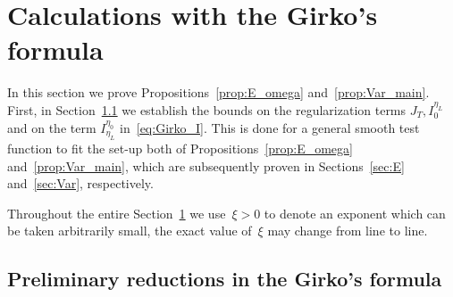 \documentclass[10pt]{amsart}
\numberwithin{equation}{section}
\begin{document}







\section{Calculations with the Girko's formula}\label{sec:Girko_calculations}

In this section we prove Propositions~\ref{prop:E_omega} and~\ref{prop:Var_main}. First, in Section~\ref{sec:Girko_reduct} we establish the bounds on the regularization terms $J_T, I_0^{\eta_L}$ and on the term $I_{\eta_L}^{\eta_0}$ in~\eqref{eq:Girko_I}. This is done for a general smooth test function to fit the set-up both of Propositions~\ref{prop:E_omega} and~\ref{prop:Var_main}, which are subsequently proven in Sections~\ref{sec:E} and~\ref{sec:Var}, respectively.

Throughout the entire Section~\ref{sec:Girko_calculations} we use~$\xi>0$ to denote an exponent which can be taken arbitrarily small, the exact value of~$\xi$ may change from line to line.

\subsection{Preliminary reductions in the Girko's formula}\label{sec:Girko_reduct}
\end{document}
